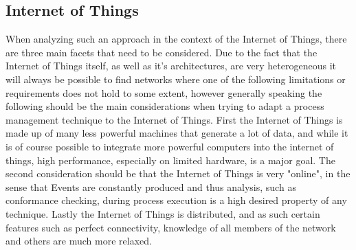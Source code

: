 \documentclass[runningheads]{template/llncs}
\begin{document}
\subsection{Internet of Things}
When analyzing such an approach in the context of the Internet of Things, there are three main facets that need to be considered.
Due to the fact that the Internet of Things itself, as well as it's architectures, are very heterogeneous it will always be possible to find networks where one of the following limitations or requirements does not hold to some extent, however generally speaking the following should be the main considerations when trying to adapt a process management technique to the Internet of Things.
First the Internet of Things is made up of many less powerful machines that generate a lot of data, and while it is of course possible to integrate more powerful computers into the internet of things, high performance, especially on limited hardware, is a major goal.
The second consideration should be that the Internet of Things is very "online", in the sense that Events are constantly produced and thus analysis, such as conformance checking, during process execution is a high desired property of any technique. 
Lastly the Internet of Things is distributed, and as such certain features such as perfect connectivity, knowledge of all members of the network and others are much more relaxed.
\end{document}
